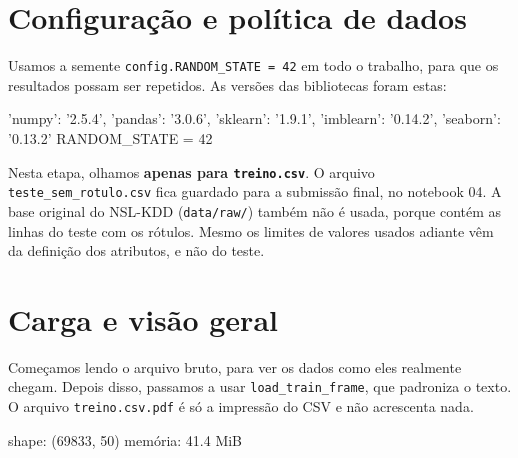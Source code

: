 \documentclass[11pt,a4paper]{article}
\begin{document}
\setcounter{section}{-1}

\section{Configuração e política de dados}

Usamos a semente \texttt{config.RANDOM\_STATE = 42} em todo o trabalho, para que os resultados possam ser repetidos. As versões das bibliotecas foram estas:

\begin{saida}
{'numpy': '2.5.4', 'pandas': '3.0.6', 'sklearn': '1.9.1', 'imblearn': '0.14.2', 'seaborn': '0.13.2'}
RANDOM_STATE = 42
\end{saida}

Nesta etapa, olhamos \textbf{apenas para \texttt{treino.csv}}. O arquivo \texttt{teste\_sem\_rotulo.csv} fica guardado para a submissão final, no notebook 04. A base original do NSL-KDD (\texttt{data/raw/}) também não é usada, porque contém as linhas do teste com os rótulos. Mesmo os limites de valores usados adiante vêm da definição dos atributos, e não do teste.

\section{Carga e visão geral}

Começamos lendo o arquivo bruto, para ver os dados como eles realmente chegam. Depois disso, passamos a usar \texttt{load\_train\_frame}, que padroniza o texto. O arquivo \texttt{treino.csv.pdf} é só a impressão do CSV e não acrescenta nada.

\begin{saida}
shape: (69833, 50)
memória: 41.4 MiB
\end{saida}
\end{document}

